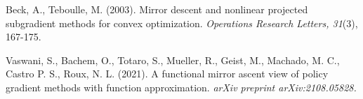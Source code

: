 \documentclass[a4paper, 11pt]{article}
\begin{document}
\medskip
\small
\begin{list}{}{%
    \setlength{\topsep}{0pt}%
    \setlength{\leftmargin}{0.2in}%
    \setlength{\listparindent}{-0.2in}%
    \setlength{\itemindent}{-0.2in}%
    \setlength{\parsep}{\parskip}%
  }%

\item[] Beck, A., Teboulle, M. (2003). Mirror descent and nonlinear projected subgradient methods for convex optimization. \textit{Operations Research Letters, 31}(3), 167-175.
  
\item[] Vaswani, S., Bachem, O., Totaro, S., Mueller, R., Geist, M., Machado, M. C., Castro P. S., Roux, N. L. (2021). A functional mirror ascent view of policy gradient methods with function approximation. \textit{arXiv preprint arXiv:2108.05828.}
  
\end{list}
\end{document}
